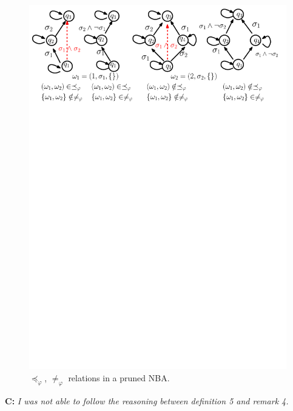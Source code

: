 \documentclass[10pt]{article}
\begin{document}
\begin{figure}[ht]
	\centering
	\includegraphics[scale=0.5]{figs/explain_about_remark4.pdf}
	\caption{$\preceq_\varphi$, $\neq_\varphi$ relations in a pruned NBA.}
	\label{fig:example_remark_4}
\end{figure}


\textbf{C:}
\emph{ I was not able to follow the reasoning between definition 5 and remark 4.
}
\end{document}
